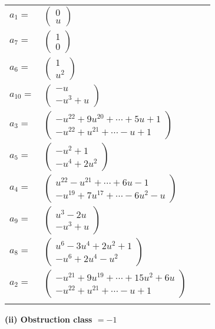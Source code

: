 \documentclass[1p]{elsarticle_modified}
\theoremstyle{definition}
\begin{document}
\begin{tabular}{m{7pt} m{180pt} m{7pt} m{180pt} }
\flushright $a_{1}=$&$\begin{pmatrix}0\\u\end{pmatrix}$ \\
\flushright $a_{7}=$&$\begin{pmatrix}1\\0\end{pmatrix}$ \\
\flushright $a_{6}=$&$\begin{pmatrix}1\\u^2\end{pmatrix}$ \\
\flushright $a_{10}=$&$\begin{pmatrix}- u\\- u^3+u\end{pmatrix}$ \\
\flushright $a_{3}=$&$\begin{pmatrix}- u^{22}+9 u^{20}+\cdots+5 u+1\\- u^{22}+u^{21}+\cdots- u+1\end{pmatrix}$ \\
\flushright $a_{5}=$&$\begin{pmatrix}- u^2+1\\- u^4+2 u^2\end{pmatrix}$ \\
\flushright $a_{4}=$&$\begin{pmatrix}u^{22}- u^{21}+\cdots+6 u-1\\- u^{19}+7 u^{17}+\cdots-6 u^2- u\end{pmatrix}$ \\
\flushright $a_{9}=$&$\begin{pmatrix}u^3-2 u\\- u^3+u\end{pmatrix}$ \\
\flushright $a_{8}=$&$\begin{pmatrix}u^6-3 u^4+2 u^2+1\\- u^6+2 u^4- u^2\end{pmatrix}$ \\
\flushright $a_{2}=$&$\begin{pmatrix}- u^{21}+9 u^{19}+\cdots+15 u^2+6 u\\- u^{22}+u^{21}+\cdots- u+1\end{pmatrix}$\\&\end{tabular}
\flushleft \textbf{(ii) Obstruction class $= -1$}\\~\\
\end{document}
